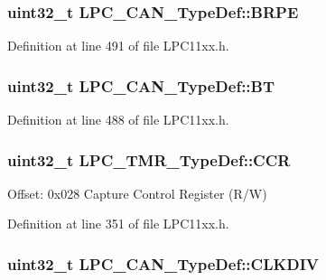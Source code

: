 \subsubsection[{\texorpdfstring{B\+R\+PE}{BRPE}}]{ uint32\+\_\+t L\+P\+C\+\_\+\+C\+A\+N\+\_\+\+Type\+Def\+::\+B\+R\+PE}\hypertarget{group___l_p_c11xx___definitions_ga3b7c082aa752b35a5167f664ba74aafc}{}\label{group___l_p_c11xx___definitions_ga3b7c082aa752b35a5167f664ba74aafc}


Definition at line 491 of file L\+P\+C11xx.\+h.

\subsubsection[{\texorpdfstring{BT}{BT}}]{ uint32\+\_\+t L\+P\+C\+\_\+\+C\+A\+N\+\_\+\+Type\+Def\+::\+BT}\hypertarget{group___l_p_c11xx___definitions_ga5c23c4ebe014434dacbc966d68846f21}{}\label{group___l_p_c11xx___definitions_ga5c23c4ebe014434dacbc966d68846f21}


Definition at line 488 of file L\+P\+C11xx.\+h.

\subsubsection[{\texorpdfstring{C\+CR}{CCR}}]{ uint32\+\_\+t L\+P\+C\+\_\+\+T\+M\+R\+\_\+\+Type\+Def\+::\+C\+CR}\hypertarget{group___l_p_c11xx___definitions_ga097d57fef779a73f06690de0b0710753}{}\label{group___l_p_c11xx___definitions_ga097d57fef779a73f06690de0b0710753}
Offset\+: 0x028 Capture Control Register (R/W) 

Definition at line 351 of file L\+P\+C11xx.\+h.

\subsubsection[{\texorpdfstring{C\+L\+K\+D\+IV}{CLKDIV}}]{ uint32\+\_\+t L\+P\+C\+\_\+\+C\+A\+N\+\_\+\+Type\+Def\+::\+C\+L\+K\+D\+IV}\hypertarget{group___l_p_c11xx___definitions_ga4a89a19bd8d6a91479a7d60830850bbd}{}\label{group___l_p_c11xx___definitions_ga4a89a19bd8d6a91479a7d60830850bbd}


